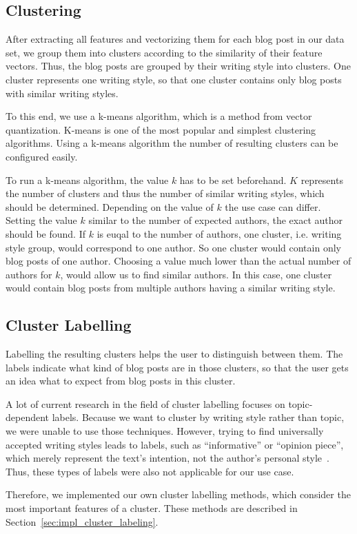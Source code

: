 
\subsection{Clustering}
\label{sec:clustering}

After extracting all features and vectorizing them for each blog post in our data set, we group them into clusters according to the similarity of their feature vectors.
Thus, the blog posts are grouped by their writing style into clusters.
One cluster represents one writing style, so that one cluster contains only blog posts with similar writing styles.


To this end, we use a k-means algorithm, which is a method from vector quantization.
K-means is one of the most popular and simplest clustering algorithms.
Using a k-means algorithm the number of resulting clusters can be configured easily.


To run a k-means algorithm, the value $k$ has to be set beforehand.
$K$ represents the number of clusters and thus the number of similar writing styles, which should be determined.
Depending on the value of $k$ the use case can differ.
Setting the value $k$ similar to the number of expected authors, the exact author should be found.
If $k$ is euqal to the number of authors, one cluster, i.e. writing style group, would correspond to one author.
So one cluster would contain only blog posts of one author.
Choosing a value much lower than the actual number of authors for $k$, would allow us to find similar authors.
In this case, one cluster would contain blog posts from multiple authors having a similar writing style.



\subsection{Cluster Labelling}
\label{sec:cluster_labeling}

Labelling the resulting clusters helps the user to distinguish between them.
The labels indicate what kind of blog posts are in those clusters, so that the user gets an idea what to expect from blog posts in this cluster.


A lot of current research in the field of cluster labelling focuses on topic-dependent labels.
Because we want to cluster by writing style rather than topic, we were unable to use those techniques.
However, trying to find universally accepted writing styles leads to labels, such as ``informative'' or ``opinion piece'', which merely represent the text's intention, not the author's personal style~\cite{lee2001genres}.
Thus, these types of labels were also not applicable for our use case.


Therefore, we implemented our own cluster labelling methods, which consider the most important features of a cluster.
These methods are described in Section~\ref{sec:impl_cluster_labeling}.
